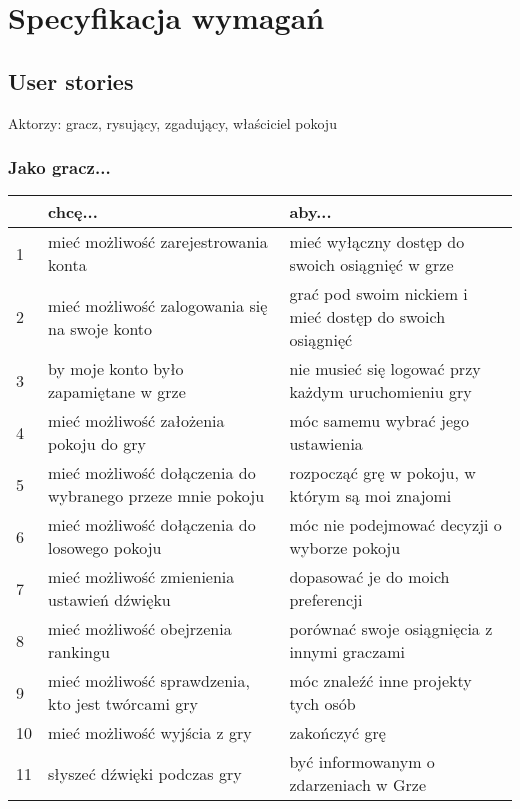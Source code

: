 \chapter{Specyfikacja wymagań}
\section{User stories}
Aktorzy: gracz, rysujący, zgadujący, właściciel pokoju
\subsection{Jako gracz...}
\begin{center}
    \begin{tabular}{ | l || p{6cm} | p{6cm} |}
    \hline
     & \textbf{chcę...} & \textbf{aby...} \\ \hline \hline
    1 & mieć możliwość zarejestrowania konta & mieć wyłączny dostęp do swoich osiągnięć w grze \\ \hline
    2 & mieć możliwość zalogowania się na swoje konto & grać pod swoim nickiem i mieć dostęp do swoich osiągnięć \\ \hline
    3 & by moje konto było zapamiętane w grze & nie musieć się logować przy każdym uruchomieniu gry \\ \hline
    4 & mieć możliwość założenia pokoju do gry & móc samemu wybrać jego ustawienia \\ \hline
    5 & mieć możliwość dołączenia do wybranego przeze mnie pokoju & rozpocząć grę w pokoju, w którym są moi znajomi \\ \hline
    6 & mieć możliwość dołączenia do losowego pokoju & móc nie podejmować decyzji o wyborze pokoju \\ \hline
    7 & mieć możliwość zmienienia ustawień dźwięku & dopasować je do moich preferencji \\ \hline
    8 & mieć możliwość obejrzenia rankingu & porównać swoje osiągnięcia z innymi graczami \\ \hline
    9 & mieć możliwość sprawdzenia, kto jest twórcami gry & móc znaleźć inne projekty tych osób \\ \hline
    10 & mieć możliwość wyjścia z gry & zakończyć grę \\ \hline
    11 & słyszeć dźwięki podczas gry & być informowanym o zdarzeniach w Grze \\ \hline
    \end{tabular}
\end{center}

